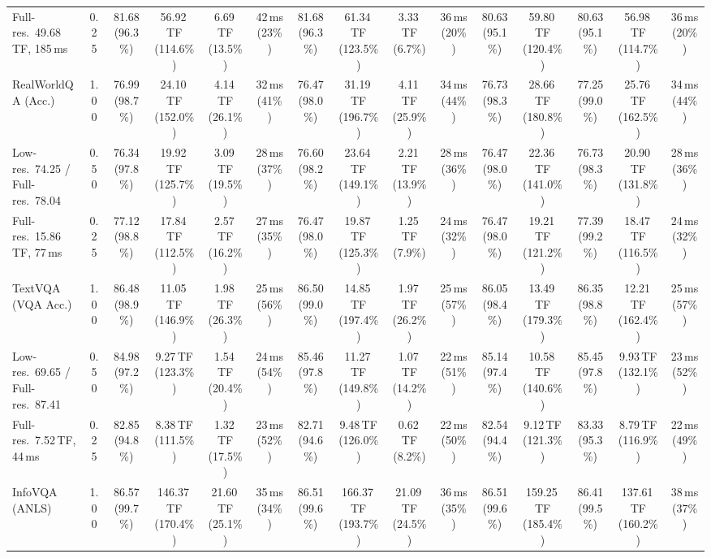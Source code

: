 \begin{table}[t]
{\begin{tabular}{l c | c c c c | c c c c | c c | c c c}
{\footnotesize Full-res.\ 49.68\,TF, 185\,ms} & 0.25 & 81.68 (96.3\%) & 56.92\,TF (114.6\%) & 6.69\,TF (13.5\%) & 42\,ms (23\%) & 81.68 (96.3\%) & 61.34\,TF (123.5\%) & 3.33\,TF (6.7\%) & 36\,ms (20\%) & 80.63 (95.1\%) & 59.80\,TF (120.4\%) & 80.63 (95.1\%) & 56.98\,TF (114.7\%) & 36\,ms (20\%) \\
\cmidrule(lr){1-15}
RealWorldQA (Acc.) & 1.00 & \cellcolor{gray!15}76.99 (98.7\%) & 24.10\,TF (152.0\%) & 4.14\,TF (26.1\%) & 32\,ms (41\%) & 76.47 (98.0\%) & 31.19\,TF (196.7\%) & 4.11\,TF (25.9\%) & 34\,ms (44\%) & \cellcolor{gray!15}76.73 (98.3\%) & 28.66\,TF (180.8\%) & \cellcolor{gray!15}77.25 (99.0\%) & 25.76\,TF (162.5\%) & 34\,ms (44\%) \\
{\footnotesize Low-res.\ 74.25 / Full-res.\ 78.04} & 0.50 & 76.34 (97.8\%) & 19.92\,TF (125.7\%) & 3.09\,TF (19.5\%) & 28\,ms (37\%) & \cellcolor{gray!15}76.60 (98.2\%) & 23.64\,TF (149.1\%) & 2.21\,TF (13.9\%) & 28\,ms (36\%) & 76.47 (98.0\%) & 22.36\,TF (141.0\%) & \cellcolor{gray!15}76.73 (98.3\%) & 20.90\,TF (131.8\%) & 28\,ms (36\%) \\
{\footnotesize Full-res.\ 15.86\,TF, 77\,ms} & 0.25 & \cellcolor{gray!15}77.12 (98.8\%) & 17.84\,TF (112.5\%) & 2.57\,TF (16.2\%) & 27\,ms (35\%) & 76.47 (98.0\%) & 19.87\,TF (125.3\%) & 1.25\,TF (7.9\%) & 24\,ms (32\%) & 76.47 (98.0\%) & 19.21\,TF (121.2\%) & \cellcolor{gray!15}77.39 (99.2\%) & 18.47\,TF (116.5\%) & 24\,ms (32\%) \\
\cmidrule(lr){1-15}
TextVQA (VQA Acc.) & 1.00 & \cellcolor{gray!15}86.48 (98.9\%) & 11.05\,TF (146.9\%) & 1.98\,TF (26.3\%) & 25\,ms (56\%) & \cellcolor{gray!15}86.50 (99.0\%) & 14.85\,TF (197.4\%) & 1.97\,TF (26.2\%) & 25\,ms (57\%) & \cellcolor{gray!15}86.05 (98.4\%) & 13.49\,TF (179.3\%) & \cellcolor{gray!15}86.35 (98.8\%) & 12.21\,TF (162.4\%) & 25\,ms (57\%) \\
{\footnotesize Low-res.\ 69.65 / Full-res.\ 87.41} & 0.50 & 84.98 (97.2\%) & 9.27\,TF (123.3\%) & 1.54\,TF (20.4\%) & 24\,ms (54\%) & 85.46 (97.8\%) & 11.27\,TF (149.8\%) & 1.07\,TF (14.2\%) & 22\,ms (51\%) & 85.14 (97.4\%) & 10.58\,TF (140.6\%) & 85.45 (97.8\%) & 9.93\,TF (132.1\%) & 23\,ms (52\%) \\
{\footnotesize Full-res.\ 7.52\,TF, 44\,ms} & 0.25 & 82.85 (94.8\%) & 8.38\,TF (111.5\%) & 1.32\,TF (17.5\%) & 23\,ms (52\%) & 82.71 (94.6\%) & 9.48\,TF (126.0\%) & 0.62\,TF (8.2\%) & 22\,ms (50\%) & 82.54 (94.4\%) & 9.12\,TF (121.3\%) & 83.33 (95.3\%) & 8.79\,TF (116.9\%) & 22\,ms (49\%) \\
\cmidrule(lr){1-15}
InfoVQA (ANLS) & 1.00 & \cellcolor{gray!15}86.57 (99.7\%) & 146.37\,TF (170.4\%) & 21.60\,TF (25.1\%) & 35\,ms (34\%) & \cellcolor{gray!15}86.51 (99.6\%) & 166.37\,TF (193.7\%) & 21.09\,TF (24.5\%) & 36\,ms (35\%) & \cellcolor{gray!15}86.51 (99.6\%) & 159.25\,TF (185.4\%) & \cellcolor{gray!15}86.41 (99.5\%) & 137.61\,TF (160.2\%) & 38\,ms (37\%) \\

\end{tabular}}
\end{table}
